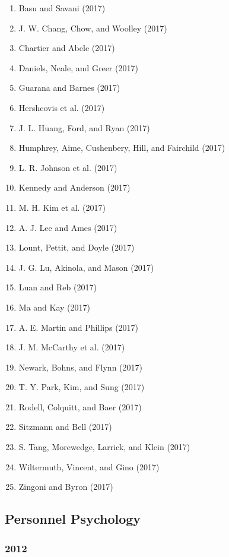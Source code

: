 \documentclass[english,man]{apa6}
\providecommand{\tightlist}{%
  \setlength{\itemsep}{0pt}\setlength{\parskip}{0pt}}
\theoremstyle{definition}
\theoremstyle{definition}
\theoremstyle{definition}
\theoremstyle{remark}
\begin{document}
\begin{enumerate}
\def\labelenumi{\arabic{enumi})}
\tightlist
\item
  Basu and Savani (2017)
\item
  J. W. Chang, Chow, and Woolley (2017)
\item
  Chartier and Abele (2017)
\item
  Daniels, Neale, and Greer (2017)
\item
  Guarana and Barnes (2017)
\item
  Hershcovis et al. (2017)
\item
  J. L. Huang, Ford, and Ryan (2017)
\item
  Humphrey, Aime, Cushenbery, Hill, and Fairchild (2017)
\item
  L. R. Johnson et al. (2017)
\item
  Kennedy and Anderson (2017)
\item
  M. H. Kim et al. (2017)
\item
  A. J. Lee and Ames (2017)
\item
  Lount, Pettit, and Doyle (2017)
\item
  J. G. Lu, Akinola, and Mason (2017)
\item
  Luan and Reb (2017)
\item
  Ma and Kay (2017)
\item
  A. E. Martin and Phillips (2017)
\item
  J. M. McCarthy et al. (2017)
\item
  Newark, Bohns, and Flynn (2017)
\item
  T. Y. Park, Kim, and Sung (2017)
\item
  Rodell, Colquitt, and Baer (2017)
\item
  Sitzmann and Bell (2017)
\item
  S. Tang, Morewedge, Larrick, and Klein (2017)
\item
  Wiltermuth, Vincent, and Gino (2017)
\item
  Zingoni and Byron (2017)
\end{enumerate}

\subsection{Personnel Psychology}\label{personnel-psychology}

\subsubsection{2012}\label{section-30}
\end{document}
